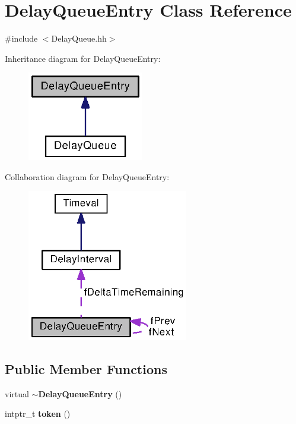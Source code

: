 \section{Delay\+Queue\+Entry Class Reference}
\label{classDelayQueueEntry}


{\ttfamily \#include $<$Delay\+Queue.\+hh$>$}



Inheritance diagram for Delay\+Queue\+Entry\+:
\nopagebreak
\begin{figure}[H]
\begin{center}
\leavevmode
\includegraphics[width=144pt]{classDelayQueueEntry__inherit__graph}
\end{center}
\end{figure}


Collaboration diagram for Delay\+Queue\+Entry\+:
\nopagebreak
\begin{figure}[H]
\begin{center}
\leavevmode
\includegraphics[width=199pt]{classDelayQueueEntry__coll__graph}
\end{center}
\end{figure}
\subsection*{Public Member Functions}
\begin{DoxyCompactItemize}
\item 
virtual {\bf $\sim$\+Delay\+Queue\+Entry} ()
\item 
intptr\+\_\+t {\bf token} ()
\end{DoxyCompactItemize}
